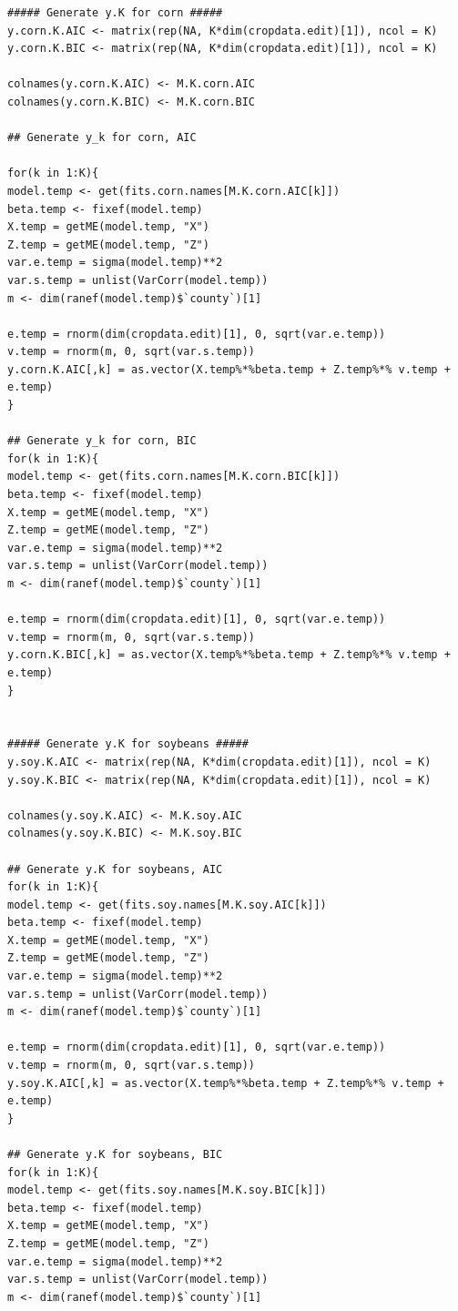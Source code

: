 \documentclass{article}
\begin{document}
\begin{Verbatim}[fontsize=\tiny]
##### Generate y.K for corn #####
y.corn.K.AIC <- matrix(rep(NA, K*dim(cropdata.edit)[1]), ncol = K)
y.corn.K.BIC <- matrix(rep(NA, K*dim(cropdata.edit)[1]), ncol = K)

colnames(y.corn.K.AIC) <- M.K.corn.AIC
colnames(y.corn.K.BIC) <- M.K.corn.BIC

## Generate y_k for corn, AIC

for(k in 1:K){
model.temp <- get(fits.corn.names[M.K.corn.AIC[k]])
beta.temp <- fixef(model.temp)
X.temp = getME(model.temp, "X")
Z.temp = getME(model.temp, "Z")
var.e.temp = sigma(model.temp)**2
var.s.temp = unlist(VarCorr(model.temp))
m <- dim(ranef(model.temp)$`county`)[1]

e.temp = rnorm(dim(cropdata.edit)[1], 0, sqrt(var.e.temp))
v.temp = rnorm(m, 0, sqrt(var.s.temp))
y.corn.K.AIC[,k] = as.vector(X.temp%*%beta.temp + Z.temp%*% v.temp + e.temp)
}

## Generate y_k for corn, BIC
for(k in 1:K){
model.temp <- get(fits.corn.names[M.K.corn.BIC[k]])
beta.temp <- fixef(model.temp)
X.temp = getME(model.temp, "X")
Z.temp = getME(model.temp, "Z")
var.e.temp = sigma(model.temp)**2
var.s.temp = unlist(VarCorr(model.temp))
m <- dim(ranef(model.temp)$`county`)[1]

e.temp = rnorm(dim(cropdata.edit)[1], 0, sqrt(var.e.temp))
v.temp = rnorm(m, 0, sqrt(var.s.temp))
y.corn.K.BIC[,k] = as.vector(X.temp%*%beta.temp + Z.temp%*% v.temp + e.temp)
}


##### Generate y.K for soybeans #####
y.soy.K.AIC <- matrix(rep(NA, K*dim(cropdata.edit)[1]), ncol = K)
y.soy.K.BIC <- matrix(rep(NA, K*dim(cropdata.edit)[1]), ncol = K)

colnames(y.soy.K.AIC) <- M.K.soy.AIC
colnames(y.soy.K.BIC) <- M.K.soy.BIC

## Generate y.K for soybeans, AIC
for(k in 1:K){
model.temp <- get(fits.soy.names[M.K.soy.AIC[k]])
beta.temp <- fixef(model.temp)
X.temp = getME(model.temp, "X")
Z.temp = getME(model.temp, "Z")
var.e.temp = sigma(model.temp)**2
var.s.temp = unlist(VarCorr(model.temp))
m <- dim(ranef(model.temp)$`county`)[1]

e.temp = rnorm(dim(cropdata.edit)[1], 0, sqrt(var.e.temp))
v.temp = rnorm(m, 0, sqrt(var.s.temp))
y.soy.K.AIC[,k] = as.vector(X.temp%*%beta.temp + Z.temp%*% v.temp + e.temp)
}

## Generate y.K for soybeans, BIC
for(k in 1:K){
model.temp <- get(fits.soy.names[M.K.soy.BIC[k]])
beta.temp <- fixef(model.temp)
X.temp = getME(model.temp, "X")
Z.temp = getME(model.temp, "Z")
var.e.temp = sigma(model.temp)**2
var.s.temp = unlist(VarCorr(model.temp))
m <- dim(ranef(model.temp)$`county`)[1]


\end{Verbatim}
\end{document}
